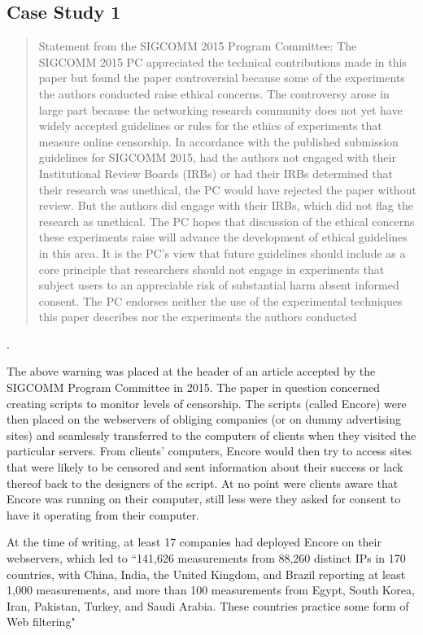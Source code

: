 \documentclass{svjour3}                     %
\begin{document}
\subsection{Case Study 1}
\label{sec:case1}

\begin{quote}Statement from the SIGCOMM 2015 Program Committee: The SIGCOMM 2015 PC appreciated the technical contributions made in this paper but found the paper controversial because some of the experiments the authors conducted raise ethical concerns. The controversy arose in large part because the networking research community does not yet have widely accepted guidelines or rules for the ethics of experiments that measure online censorship. In accordance with the published submission guidelines for SIGCOMM 2015, had the authors not engaged with their Institutional Review Boards (IRBs) or had their IRBs determined that their research was unethical, the PC would have rejected the paper without review. But the authors did engage with their IRBs, which did not flag the research as unethical. The PC hopes that discussion of the ethical concerns these experiments raise will advance the development of ethical guidelines in this area. It is the PC’s view that future guidelines should include as a core principle that researchers should not engage in experiments that subject users to an appreciable risk of substantial harm absent informed consent. The PC endorses neither the use of the experimental techniques this paper describes nor the experiments the authors conducted
	\end{quote} \cite{burnett2015encore}.


The above warning was placed at the header of an article accepted by the SIGCOMM Program Committee in 2015.  The paper in question concerned creating scripts to monitor levels of censorship.  The scripts (called Encore) were then placed on the webservers of obliging companies (or on dummy advertising sites) and seamlessly transferred to the computers of clients when they visited the particular servers.  From clients' computers, Encore would then try to access sites that were likely to be censored and sent information about their success or lack thereof back to the designers of the script.  At no point were clients aware that Encore was running on their computer, still less were they asked for consent to have it operating from their computer.  

At the time of writing, at least 17 companies had deployed Encore on their webservers, which led to ``141,626 measurements from 88,260 distinct IPs in 170 countries, with China, India, the United Kingdom, and Brazil reporting at least 1,000 measurements, and more than 100 measurements from Egypt, South Korea, Iran, Pakistan, Turkey, and Saudi Arabia. These countries practice some form of Web filtering" \cite[p.~662] {burnett2015encore}
\end{document}
